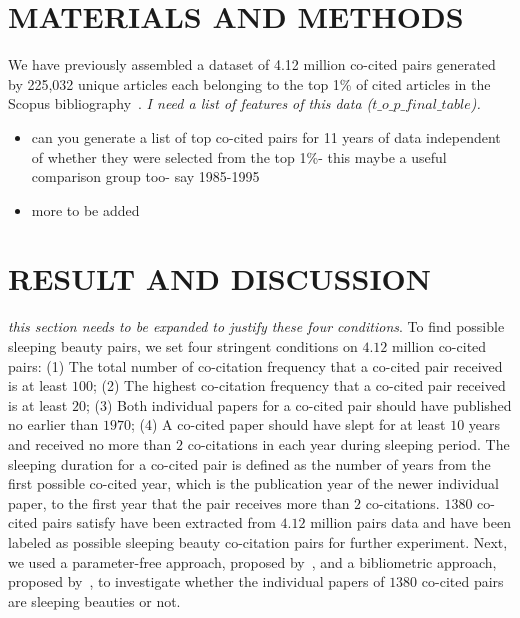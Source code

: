 \documentclass[utf8]{frontiersSCNS}
\begin{document}
\section{MATERIALS AND METHODS}

We have previously assembled a dataset of 4.12 million co-cited pairs generated by 225,032 unique articles each belonging to the top 1\% of cited articles in the Scopus bibliography~\citep[Figure~2]{Devarakonda_2020}. \emph{I need a list of features of this data ($t\_o\_p\_final\_table$).}

\begin{itemize}
\item can you generate a list of top co-cited pairs for 11 years of data independent of whether they were selected from the top 1\%- this maybe a useful comparison group too- say 1985-1995
\item more to be added
\end{itemize}

\section{RESULT AND DISCUSSION}


\emph{this section needs to be expanded to justify these four conditions}. To find possible sleeping beauty pairs, we set four stringent conditions on $4.12$ million co-cited pairs: (1) The total number of co-citation frequency that a co-cited pair received is at least $100$; (2) The highest co-citation frequency that a co-cited pair received is at least $20$; (3) Both individual papers for a co-cited pair should have published no earlier than $1970$; (4) A co-cited paper should have slept for at least $10$ years and received no more than $2$ co-citations in each year during sleeping period. 
The sleeping duration for a co-cited pair is defined as the number of years from the first possible co-cited year, which is the publication year of the newer individual paper, to the first year that the pair receives more than $2$ co-citations. $1380$ co-cited pairs satisfy have been extracted from $4.12$ million pairs data and have been labeled as possible sleeping beauty co-citation pairs for further experiment. 
Next, we used a parameter-free approach, proposed by~\citep{Ke2015}, and a bibliometric approach, proposed by~\citep{Raan2019}, to investigate whether the individual papers of $1380$ co-cited pairs are sleeping beauties or not. 
\end{document}
